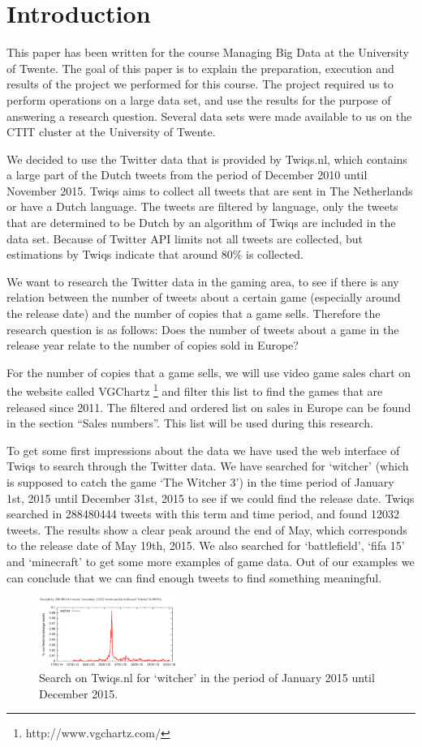\section{Introduction}
This paper has been written for the course Managing Big Data at the University of Twente. The goal of this paper is to explain the preparation, execution and results of the project we performed for this course. The project required us to perform operations on a large data set, and use the results for the purpose of answering a research question. Several data sets were made available to us on the CTIT cluster at the University of Twente. 

We decided to use the Twitter data that is provided by Twiqs.nl, which contains a large part of the Dutch tweets from the period of December 2010 until November 2015. Twiqs aims to collect all tweets that are sent in The Netherlands or have a Dutch language. The tweets are filtered by language, only the tweets that are determined to be Dutch by an algorithm of Twiqs are included in the data set. Because of Twitter API limits not all tweets are collected, but estimations by Twiqs indicate that around 80\% is collected.

We want to research the Twitter data in the gaming area, to see if there is any relation between the number of tweets about a certain game (especially around the release date) and the number of copies that a game sells. Therefore the research question is as follows:
Does the number of tweets about a game in the release year relate to the number of copies sold in Europe?

For the number of copies that a game sells, we will use video game sales chart on  the website called VGChartz \footnote{http://www.vgchartz.com/} and filter this list to find the games that are released since 2011. The filtered and ordered list on sales in Europe can be found in the section “Sales numbers”. This list will be used during this research.

To get some first impressions about the data we have used the web interface of Twiqs to search through the Twitter data. We have searched for ‘witcher’ (which is supposed to catch the game ‘The Witcher 3’) in the time period of January 1st, 2015 until December 31st, 2015 to see if we could find the release date. Twiqs searched in 288480444 tweets with this term and time period, and found 12032 tweets. The results show a clear peak around the end of May, which corresponds to the release date of May 19th, 2015. We also searched for ‘battlefield’, ‘fifa 15’ and ‘minecraft’ to get some more examples of game data. Out of our examples we can conclude that we can find enough tweets to find something meaningful.
\begin{figure}[!ht]
	\centering
		\includegraphics[width=0.4\textwidth]{twiqswitcher}
	\caption{Search on Twiqs.nl for ‘witcher’ in the period of January 2015 until December 2015.}
\end{figure}

